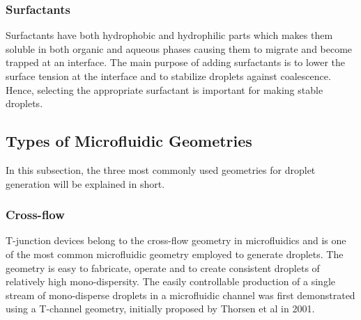 \subsubsection{Surfactants}
Surfactants have both hydrophobic and hydrophilic parts which makes them soluble in both organic and aqueous phases causing them to migrate and become trapped at an interface. The main purpose of adding surfactants is to lower the surface tension at the interface and to stabilize droplets against coalescence. Hence, selecting the appropriate surfactant is important for making stable droplets. \parencite{Baret2012,Kovalchuk2018}

\subsection{Types of Microfluidic Geometries}
In this subsection, the three most commonly used geometries for droplet generation will be explained in short. 


\subsubsection{Cross-flow}  
T-junction devices belong to the cross-flow geometry in microfluidics and is one of the most common microfluidic geometry employed to generate droplets. The geometry is easy to fabricate, operate and to create consistent droplets of relatively high mono-dispersity. \parencite{Zhu2017} The easily controllable production of a single stream of mono-disperse droplets in a microfluidic channel was first demonstrated using a T-channel geometry, initially proposed by Thorsen et al in 2001. \parencite{Thorsen2001}


